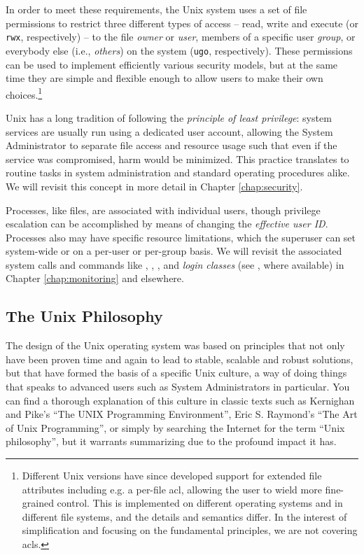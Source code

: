 In order to meet these requirements, the Unix system
uses a set of file permissions to restrict three
different types of access -- read, write and execute
(or {\tt rwx}, respectively) -- to the file {\em
owner} or {\em user}, members of a specific user {\em
group}, or everybody else (i.e., {\em others}) on the
system ({\tt ugo}, respectively).  These permissions
can be used to implement efficiently various security
models, but at the same time they are simple and
flexible enough to allow users to make their own
choices.\footnote{Different Unix versions have since
developed support for extended file
attributes
including e.g. a per-file \gls{acl}, allowing the user
to wield more fine-grained control.  This is
implemented on different operating systems and in
different file systems, and the details and semantics
differ. In the interest of simplification and focusing
on the fundamental principles, we are not covering
\gls{acl}s.}

Unix has a long tradition of following the {\em
principle of least privilege}: system services are usually run
using a dedicated user account, allowing the System
Administrator to separate file access and resource
usage such that even if the service was compromised,
harm would be minimized.  This practice translates
to routine tasks in system administration and standard
operating procedures alike.  We will revisit this
concept in more detail in Chapter \ref{chap:security}.

Processes, like files, are associated with individual
users, though privilege escalation can be accomplished by means of changing
the {\em effective user ID}.  Processes also may have specific resource
limitations, which the superuser can set system-wide
or on a per-user or per-group basis.  We will revisit
the associated system calls and commands like
, ,
, and {\em login
classes} (see
, where available) in Chapter
\ref{chap:monitoring} and elsewhere.

\subsection{The Unix Philosophy}
\label{unix:philosophy}

The design of the Unix operating system was based on
principles that not only have been proven time and
again to lead to stable, scalable and robust
solutions, but that have formed the basis of a
specific Unix culture, a way of doing things that
speaks to advanced users such as System Administrators
in particular.  You can find a thorough explanation of
this culture in classic texts such as
Kernighan and
Pike's ``The UNIX Programming
Environment''\cite{history:kernighan-pike-upe}, Eric
S.  Raymond's ``The Art of Unix
Programming''\cite{history:esr-taoup}, or simply by
searching the Internet for the term ``Unix
philosophy'', but it warrants summarizing due to the
profound impact it has.

